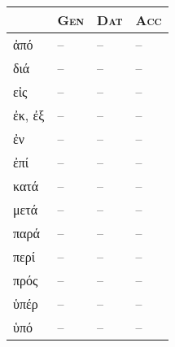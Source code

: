 \documentclass[10pt]{memoir}
\newcommand{\tsc}[1]{\textsc{#1}}
\newcommand{\grc}[1]{\fontspec{Inter}#1}
\begin{document}
    \begin{table}[H]
        \begin{tabular}{llll}
            & \tsc{Gen} & \tsc{Dat} & \tsc{Acc} \\
            \hline
            \grc{ἀπό} & -- & -- & -- \\
            \grc{διά} & -- & -- & -- \\
            \grc{εἰς} & -- & -- & -- \\
            \grc{ἐκ}, \grc{ἐξ} & -- & -- & -- \\
            \grc{ἐν} & -- & -- & -- \\
            \grc{ἐπί} & -- & -- & -- \\
            \grc{κατά} & -- & -- & -- \\
            \grc{μετά} & -- & -- & -- \\
            \grc{παρά} & -- & -- & -- \\
            \grc{περί} & -- & -- & -- \\
            \grc{πρός} & -- & -- & -- \\
            \grc{ὑπέρ} & -- & -- & -- \\
            \grc{ὑπό} & -- & -- & -- \\
        \end{tabular}
    \end{table}
\end{document}
